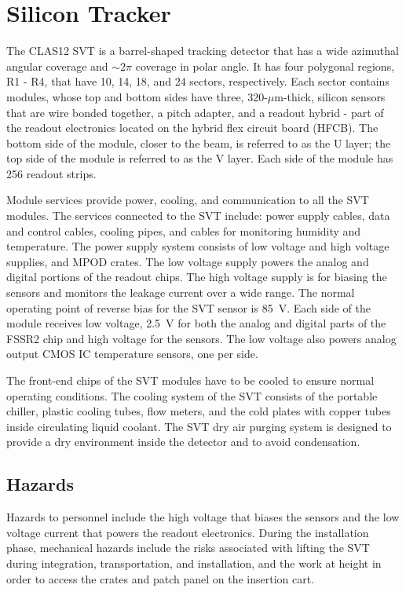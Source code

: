\section{Silicon Tracker}

The CLAS12 SVT is a barrel-shaped tracking detector that has a wide azimuthal angular 
coverage and $\sim 2\pi$ coverage in polar angle. It has four polygonal regions, R1 - R4, 
that have 10, 14, 18, and 24 sectors, respectively. Each sector contains modules, whose top 
and bottom sides have three, 320-$\mu$m-thick, silicon sensors that are wire bonded together, 
a pitch adapter, and a readout hybrid - part of the readout electronics located on the hybrid 
flex circuit board (HFCB). The bottom side of the module, closer to the beam, is referred to 
as the U layer; the top side of the module is referred to as the V layer. Each side of the 
module has 256 readout strips. 

Module services provide power, cooling, and communication to all the SVT modules. The services 
connected to the SVT include: power supply cables, data and control cables, cooling pipes, and 
cables for monitoring humidity and temperature. The power supply system consists of low voltage 
and high voltage supplies, and MPOD crates. The low voltage supply powers the analog and digital 
portions of the readout chips. The high voltage supply is for biasing the sensors and monitors 
the leakage current over a wide range. The normal operating point of reverse bias for the SVT 
sensor is 85~V. Each side of the module receives low voltage, 2.5~V for both the analog and 
digital parts of the FSSR2 chip and high voltage for the sensors. The low voltage also powers 
analog output CMOS IC temperature sensors, one per side.

The front-end chips of the SVT modules have to be cooled to ensure normal operating conditions. 
The cooling system of the SVT consists of the portable chiller, plastic cooling tubes, flow
meters, and the cold plates with copper tubes inside circulating liquid coolant. The SVT 
dry air  purging system is designed to provide a dry environment inside the detector and to 
avoid condensation.

\subsection{Hazards} 

Hazards to personnel include the high voltage that biases the sensors and the low voltage 
current that powers the readout electronics. During the installation phase, mechanical hazards 
include the risks associated with lifting the SVT during integration, transportation, and 
installation, and the work at height in order to access the crates and patch panel on the 
insertion cart. 

